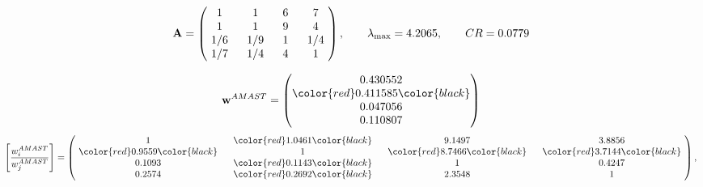 \begin{example}
\begin{equation*}
\mathbf{A} =
\begin{pmatrix}
$\,\,$ 1 $\,\,$ & $\,\,$1$\,\,$ & $\,\,$6$\,\,$ & $\,\,$7 $\,\,$ \\
$\,\,$ 1 $\,\,$ & $\,\,$ 1 $\,\,$ & $\,\,$9$\,\,$ & $\,\,$4 $\,\,$ \\
$\,\,$ 1/6$\,\,$ & $\,\,$ 1/9$\,\,$ & $\,\,$ 1 $\,\,$ & $\,\,$ 1/4 $\,\,$ \\
$\,\,$ 1/7$\,\,$ & $\,\,$ 1/4$\,\,$ & $\,\,$4$\,\,$ & $\,\,$ 1  $\,\,$ \\
\end{pmatrix},
\qquad
\lambda_{\max} =
4.2065,
\qquad
CR = 0.0779
\end{equation*}

\begin{equation*}
\mathbf{w}^{AMAST} =
\begin{pmatrix}
0.430552\\
\color{red} 0.411585\color{black} \\
0.047056\\
0.110807
\end{pmatrix}\end{equation*}
\begin{equation*}
\left[ \frac{{w}^{AMAST}_i}{{w}^{AMAST}_j} \right] =
\begin{pmatrix}
$\,\,$ 1 $\,\,$ & $\,\,$\color{red} 1.0461\color{black} $\,\,$ & $\,\,$9.1497$\,\,$ & $\,\,$3.8856$\,\,$ \\
$\,\,$\color{red} 0.9559\color{black} $\,\,$ & $\,\,$ 1 $\,\,$ & $\,\,$\color{red} 8.7466\color{black} $\,\,$ & $\,\,$\color{red} 3.7144\color{black}   $\,\,$ \\
$\,\,$0.1093$\,\,$ & $\,\,$\color{red} 0.1143\color{black} $\,\,$ & $\,\,$ 1 $\,\,$ & $\,\,$0.4247 $\,\,$ \\
$\,\,$0.2574$\,\,$ & $\,\,$\color{red} 0.2692\color{black} $\,\,$ & $\,\,$2.3548$\,\,$ & $\,\,$ 1  $\,\,$ \\
\end{pmatrix},
\end{equation*}


\end{example}
